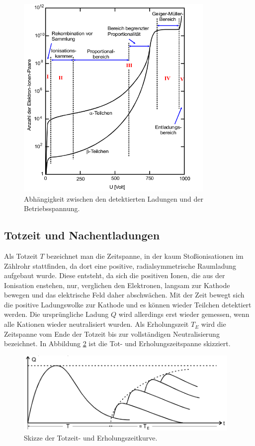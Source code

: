 \begin{figure}
  \centering
  \includegraphics[height=10cm]{MeinePics;)/EU.png}
  \caption{Abhängigkeit zwischen den detektierten Ladungen und der
  Betriebsspannung.\cite{anleitung}}
  \label{fig:EU}
\end{figure}

\FloatBarrier

\subsection{Totzeit und Nachentladungen}

Als Totzeit $T$ bezeichnet man die Zeitspanne, in der kaum Stoßionisationen im
Zählrohr stattfinden, da dort eine positive, radialsymmetrische Raumladung
aufgebaut wurde. Diese entsteht, da sich die positiven Ionen,
die aus der Ionisation enstehen, nur, verglichen den Elektronen, langsam
zur Kathode bewegen und das elektrische Feld daher abschwächen.
Mit der Zeit bewegt sich die positive Ladungswolke zur Kathode und
es können wieder Teilchen detektiert werden.
Die ursprüngliche Ladung $Q$ wird allerdings erst wieder gemessen, wenn alle
Kationen wieder neutralisiert wurden. Als Erholungszeit $T_E$ wird die
Zeitspanne vom Ende der Totzeit bis zur vollständigen Neutralisierung
bezeichnet.
In Abbildung \ref{fig:TOT} ist die Tot- und Erholungszeitspanne skizziert.

\begin{figure}
  \centering
  \includegraphics[height=4cm]{MeinePics;)/TOT.png}
  \caption{Skizze der Totzeit- und Erholungszeitkurve.\cite{anleitung}}
  \label{fig:TOT}
\end{figure}

